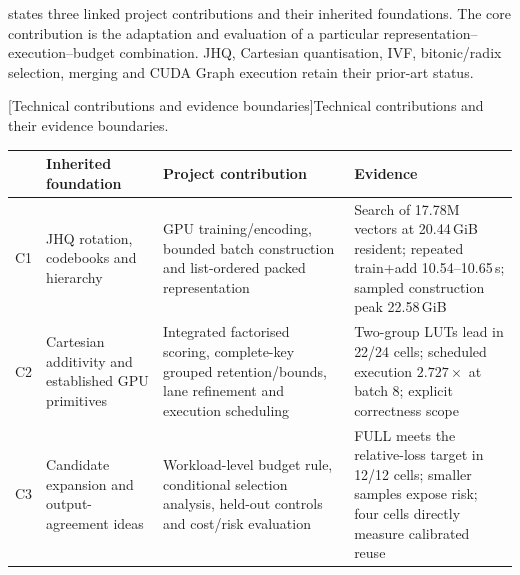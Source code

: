  states three linked project contributions and
their inherited foundations. The core contribution is the adaptation and
evaluation of a particular representation--execution--budget combination.
JHQ, Cartesian quantisation, IVF, bitonic/radix selection, merging and CUDA
Graph execution retain their prior-art status.

\par\medskip\noindent\begin{minipage}{\linewidth}
\centering\captionsetup{hypcap=false}
[Technical contributions and evidence boundaries]{Technical contributions and their evidence boundaries.}
\label{tab:1-contributions}
\footnotesize\setlength{\tabcolsep}{4pt}
\begin{tabularx}{\linewidth}{@{}l*{3}{>{\raggedright\arraybackslash}X}@{}}
\toprule
 & Inherited foundation & Project contribution & Evidence \\
\midrule
C1 & JHQ rotation, codebooks and hierarchy & GPU training/encoding,
bounded batch construction and list-ordered packed representation
& Search of 17.78M vectors at 20.44\,GiB resident; repeated train+add
10.54--10.65\,s; sampled construction peak 22.58\,GiB \\
C2 & Cartesian additivity and established GPU primitives & Integrated
factorised scoring, complete-key grouped retention/bounds, lane refinement
and execution scheduling & Two-group LUTs lead in 22/24 cells;
scheduled execution $2.727\times$ at batch 8; explicit correctness scope \\
C3 & Candidate expansion and output-agreement ideas & Workload-level
budget rule, conditional selection analysis, held-out controls and cost/risk
evaluation & FULL meets the relative-loss target in 12/12 cells;
smaller samples expose risk; four cells directly measure calibrated reuse \\
\bottomrule
\end{tabularx}
\end{minipage}\par\medskip

